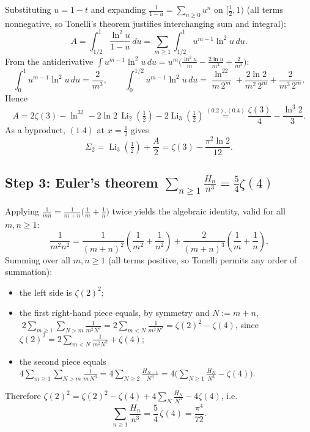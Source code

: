 \documentclass[11pt]{article}
\theoremstyle{remark}
\begin{document}
Substituting $u=1-t$ and expanding $\frac{1}{1-u}=\sum_{n\ge0}u^n$ on $[\tfrac12,1)$ (all terms nonnegative, so Tonelli's theorem justifies interchanging sum and integral):
$$A=\int_{1/2}^{1}\frac{\ln^2u}{1-u}\,du=\sum_{m\ge1}\int_{1/2}^{1}u^{m-1}\ln^2u\,du .$$
From the antiderivative $\int u^{m-1}\ln^2u\,du=u^m\Big(\frac{\ln^2u}{m}-\frac{2\ln u}{m^2}+\frac{2}{m^3}\Big)$:
\begin{equation}\int_0^1u^{m-1}\ln^2u\,du=\frac{2}{m^3},\qquad
\int_0^{1/2}u^{m-1}\ln^2u\,du=\frac{\ln^22}{m\,2^m}+\frac{2\ln2}{m^2\,2^m}+\frac{2}{m^3\,2^m}. \tag{2.1}\end{equation}
Hence
\begin{equation}A=2\zeta(3)-\ln^32-2\ln2\,\operatorname{Li}_2\!\left(\tfrac12\right)-2\operatorname{Li}_3\!\left(\tfrac12\right)
\overset{(0.2),(0.4)}{=}\frac{\zeta(3)}{4}-\frac{\ln^3 2}{3}. \tag{2.2}\end{equation}
As a byproduct, $(1.4)$ at $x=\tfrac12$ gives
\begin{equation}\Sigma_2=\operatorname{Li}_3\!\left(\tfrac12\right)+\frac{A}{2}=\zeta(3)-\frac{\pi^2\ln 2}{12}. \tag{2.3}\end{equation}

\subsection*{Step 3: Euler's theorem $\sum_{n\ge1}\frac{H_n}{n^3}=\frac54\zeta(4)$}

Applying $\frac{1}{mn}=\frac{1}{m+n}\big(\frac1m+\frac1n\big)$ twice yields the algebraic identity, valid for all $m,n\ge1$:
$$\frac{1}{m^2n^2}=\frac{1}{(m+n)^2}\left(\frac{1}{m^2}+\frac{1}{n^2}\right)+\frac{2}{(m+n)^3}\left(\frac1m+\frac1n\right).$$
Summing over all $m,n\ge1$ (all terms positive, so Tonelli permits any order of summation):

\begin{itemize}
\item the left side is $\zeta(2)^2$;
\item the first right-hand piece equals, by symmetry and $N:=m+n$, $\;2\sum_{m\ge1}\sum_{N>m}\frac{1}{m^2N^2}=2\sum_{m<N}\frac{1}{m^2N^2}=\zeta(2)^2-\zeta(4)$, since $\zeta(2)^2=2\sum_{m<N}\frac{1}{m^2N^2}+\zeta(4)$;
\item the second piece equals $4\sum_{m\ge1}\sum_{N>m}\frac{1}{m\,N^3}=4\sum_{N\ge2}\frac{H_{N-1}}{N^3}=4\Big(\sum_{N\ge1}\frac{H_N}{N^3}-\zeta(4)\Big)$.
\end{itemize}

Therefore $\zeta(2)^2=\zeta(2)^2-\zeta(4)+4\sum_{N}\frac{H_N}{N^3}-4\zeta(4)$, i.e.
\begin{equation}\sum_{n\ge1}\frac{H_n}{n^3}=\frac54\,\zeta(4)=\frac{\pi^4}{72}. \tag{3.1}\end{equation}
\end{document}
